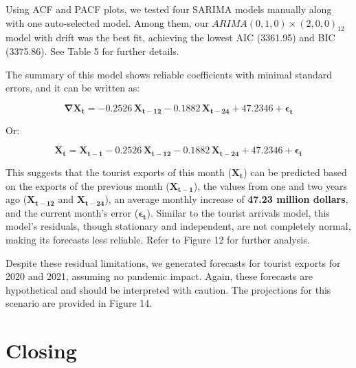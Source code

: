 \documentclass[11pt]{article}
\begin{document}
Using ACF and PACF plots, we tested four SARIMA models manually along with one auto-selected model. Among them, our $ARIMA(0,1,0)\times(2,0,0)_{12}$ model with drift was the best fit, achieving the lowest AIC (3361.95) and BIC (3375.86). See Table 5 for further details.

The summary of this model shows reliable coefficients with minimal standard errors, and it can be written as:

\begin{equation}
\mathbf{\nabla}\mathbf{X}_{\mathbf{t}} = -\mathbf{0.2526}\,\mathbf{X}_{\mathbf{t-12}} - \mathbf{0.1882}\,\mathbf{X}_{\mathbf{t-24}} + \mathbf{47.2346} + \mathbf{\epsilon}_{\mathbf{t}}
\end{equation}

Or:

\begin{equation}
\mathbf{X}_{\mathbf{t}} = \mathbf{X}_{\mathbf{t-1}} -\mathbf{0.2526}\,\mathbf{X}_{\mathbf{t-12}} - \mathbf{0.1882}\,\mathbf{X}_{\mathbf{t-24}} + \mathbf{47.2346} + \mathbf{\epsilon}_{\mathbf{t}}
\end{equation}

This suggests that the tourist exports of this month ($\mathbf{X}_{\mathbf{t}}$) can be predicted based on the exports of the previous month ($\mathbf{X}_{\mathbf{t-1}}$), the values from one and two years ago ($\mathbf{X}_{\mathbf{t-12}}$ and $\mathbf{X}_{\mathbf{t-24}}$), an average monthly increase of \textbf{47.23 million dollars}, and the current month's error ($\mathbf{\epsilon}_{\mathbf{t}}$). Similar to the tourist arrivals model, this model's residuals, though stationary and independent, are not completely normal, making its forecasts less reliable. Refer to Figure 12 for further analysis.

Despite these residual limitations, we generated forecasts for tourist exports for 2020 and 2021, assuming no pandemic impact. Again, these forecasts are hypothetical and should be interpreted with caution. The projections for this scenario are provided in Figure 14.

\section{Closing}
\end{document}

